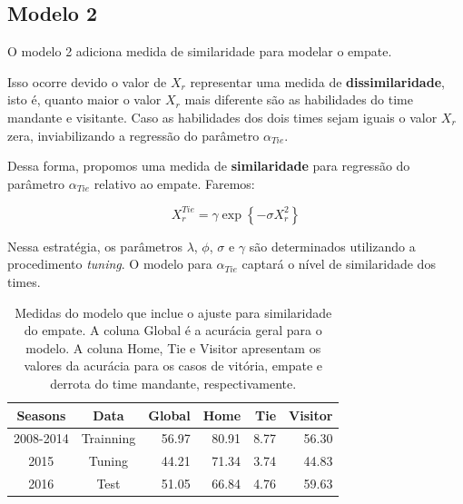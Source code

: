 \documentclass[review]{elsarticle}
\begin{document}
\newpage

\subsection{Modelo 2}
\label{sec:mod2}

O modelo 2 adiciona medida de similaridade para modelar o empate.


Isso ocorre devido o valor de $X_r$ representar uma medida de \textbf{dissimilaridade}, isto é, quanto maior o valor $X_r$ mais diferente são as habilidades do time mandante e visitante. Caso as habilidades dos dois times sejam iguais o valor  $X_r$ zera, inviabilizando a regressão do parâmetro $\alpha_{Tie}$. 

Dessa forma, propomos uma medida de \textbf{similaridade} para regressão do parâmetro $\alpha_{Tie}$ relativo ao empate. Faremos:

\begin{equation}
X_r^{Tie} = \gamma \exp{\left\{-\sigma X_r ^2\right\}}
\label{eq:transform}
\end{equation}

Nessa estratégia, os parâmetros $\lambda$, $\phi$, $\sigma$ e $\gamma$ são determinados utilizando a procedimento \textit{tuning}. O modelo para $\alpha_{Tie}$ captará o nível de similaridade dos times.


\begin{table}[ht]
\centering
\begin{tabular}{cc|r|rrr}
  \hline
Seasons & Data & \textbf{Global} & Home & Tie & Visitor \\ 
  \hline
2008-2014 & Trainning & 56.97 & 80.91 & 8.77 & 56.30 \\ 
  2015 & Tuning & 44.21 & 71.34 & 3.74 & 44.83 \\ 
  2016 & Test & 51.05 & 66.84 & 4.76 & 59.63 \\ 
   \hline
\end{tabular}
    \caption[\scriptsize{Medidas do modelo com similaridade para o empate.}]{\scriptsize{Medidas do modelo que inclue o ajuste para similaridade do empate. A coluna Global é a acurácia geral para o modelo. A coluna Home, Tie e Visitor apresentam os valores da acurácia para os casos de vitória, empate e derrota do time mandante, respectivamente. }}
    \label{tab:medidasmodsi}
\end{table}	
\end{document}
